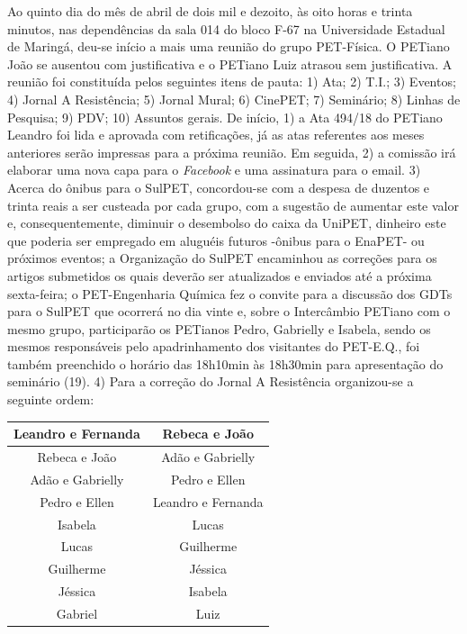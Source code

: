 \documentclass[a4paper,12pt]{report}
\begin{document}
Ao quinto dia do mês de abril de dois mil e dezoito, 
às oito horas e trinta minutos, nas dependências da sala 014 do bloco F-67 na Universidade Estadual de Maringá, deu-se início a mais uma reunião do grupo PET-Física. O PETiano João se ausentou com justificativa e o PETiano Luiz atrasou sem justificativa. A reunião foi constituída pelos seguintes itens de pauta: 
1) Ata;
2) T.I.;
3) Eventos;
4) Jornal A Resistência;
5) Jornal Mural; 
6) CinePET; 
7) Seminário; 
8) Linhas de Pesquisa; 
9) PDV; 
10) Assuntos gerais. 
De início, 
1) a Ata 494/18 do PETiano Leandro foi lida e aprovada com retificações, já as atas referentes aos meses anteriores serão impressas para a próxima reunião. 
Em seguida, 
2) a comissão irá elaborar uma nova capa para o {\itshape Facebook} e uma assinatura para o email.  
3) Acerca do ônibus para o SulPET, concordou-se com a despesa de duzentos e trinta reais a ser custeada por cada grupo, com a sugestão de aumentar este valor e, consequentemente, diminuir o desembolso do caixa da UniPET, dinheiro este que poderia ser empregado em aluguéis futuros -ônibus para o EnaPET- ou próximos eventos; a Organização do SulPET encaminhou as correções para os artigos submetidos    
os quais deverão ser atualizados e enviados até a próxima sexta-feira; o PET-Engenharia Química fez o convite para a discussão dos GDTs para o SulPET que ocorrerá no dia vinte e, sobre o Intercâmbio PETiano com o mesmo grupo, participarão os PETianos Pedro, Gabrielly e Isabela, sendo os mesmos responsáveis pelo apadrinhamento dos visitantes do PET-E.Q., foi também preenchido o horário das 18h10min às 18h30min  para apresentação do seminário (19).
4) Para a correção do Jornal A Resistência organizou-se a seguinte ordem:

\begin{table} [h!]
\centering
\begin{tabular}{|	c	|	c	|}
\hline
Leandro e Fernanda		&  Rebeca e João    	\\ \hline
Rebeca e João           & Adão e Gabrielly  	\\ \hline
Adão e Gabrielly        & Pedro e Ellen  		\\ \hline
Pedro e Ellen           & Leandro e Fernanda 	\\ \hline
Isabela					& Lucas 				\\ \hline
Lucas					& Guilherme 			\\ \hline
Guilherme 				& Jéssica 				\\ \hline
Jéssica 				& Isabela				\\ \hline
Gabriel					& Luiz 					\\ \hline
\end{tabular}
\end{table}
\end{document}
